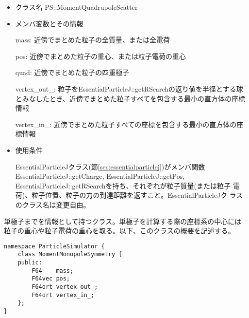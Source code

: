 \begin{itemize}
\item クラス名
  PS::MomentQuadrupoleScatter

\item メンバ変数とその情報

  mass: 近傍でまとめた粒子の全質量、または全電荷

  pos: 近傍でまとめた粒子の重心、または粒子電荷の重心
  
  quad: 近傍でまとめた粒子の四重極子
  
  vertex\_out\_: 粒子をEssentialParticleJ::getRSearchの返り値を半径とする球とみなしたとき、近傍でまとめた粒子すべてを包含する最小の直方体の座標情報
  
  vertex\_in\_: 近傍でまとめた粒子すべての座標を包含する最小の直方体の座標情報

\item 使用条件

  EssentialParticleJクラス(節\ref{sec:essentialparticlej})がメンバ関数
  EssentialParticleJ::getCharge, EssentialParticleJ::getPos,
  EssentialParticleJ::getRSearchを持ち、それぞれが粒子質量(または粒子
  電荷)、粒子位置、粒子の力の到達距離を返すこと。EssentialParticleJク
  ラスのクラス名は変更自由。

\end{itemize}


\label{sec:MomentMonopoleSymmetry}

単極子までを情報として持つクラス。単極子を計算する際の座標系の中心には
粒子の重心や粒子電荷の重心を取る。以下、このクラスの概要を記述する。
\begin{screen}
\begin{verbatim}
namespace ParticleSimulator {
    class MomentMonopoleSymmetry {
    public:
        F64    mass;
        F64vec pos;
        F64ort vertex_out_;
        F64ort vertex_in_;
    };
}
\end{verbatim}
\end{screen}

